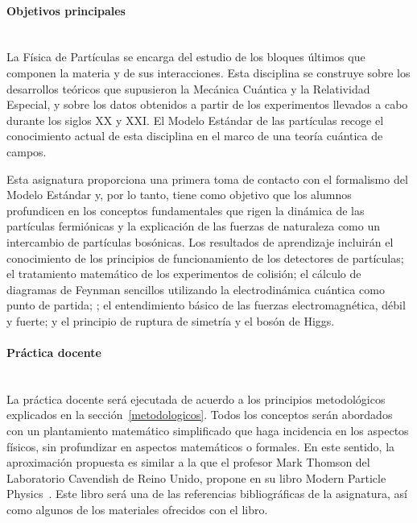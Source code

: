 \paragraph{Objetivos principales\\\\}

La Física de Partículas se encarga del estudio de los bloques últimos que componen la materia y de sus interacciones. Esta disciplina se construye sobre los desarrollos teóricos que supusieron la Mecánica Cuántica y la Relatividad Especial, y sobre los datos obtenidos a partir de los experimentos llevados a cabo durante los siglos XX y XXI. El Modelo Estándar de las partículas recoge el conocimiento actual de esta disciplina en el marco de una teoría cuántica de campos. 

Esta asignatura proporciona una primera toma de contacto con el formalismo del Modelo Estándar y, por lo tanto, tiene como objetivo que los alumnos profundicen en los conceptos fundamentales que rigen la dinámica de las partículas fermiónicas y la explicación de las fuerzas de naturaleza como un intercambio de partículas bosónicas. Los resultados de aprendizaje incluirán el conocimiento de los principios de funcionamiento de los detectores de partículas; el tratamiento matemático de los experimentos de colisión; el cálculo de diagramas de Feynman sencillos utilizando la electrodinámica cuántica como punto de partida; ; el entendimiento básico de las fuerzas electromagnética, débil y fuerte; y el principio de ruptura de simetría y el bosón de Higgs. 

\paragraph{Práctica docente\\\\}

La práctica docente será ejecutada de acuerdo a los principios metodológicos explicados en la sección~\ref{metodologicos}. Todos los conceptos serán abordados con un plantamiento matemático simplificado que haga incidencia en los aspectos físicos, sin profundizar en aspectos matemáticos o formales. En este sentido, la aproximación propuesta es similar a la que el profesor Mark Thomson del Laboratorio Cavendish de Reino Unido, propone en su libro Modern Particle Physics~\cite{thomson}. Este libro será una de las referencias bibliográficas de la asignatura, así como algunos de los materiales ofrecidos con el libro. 

